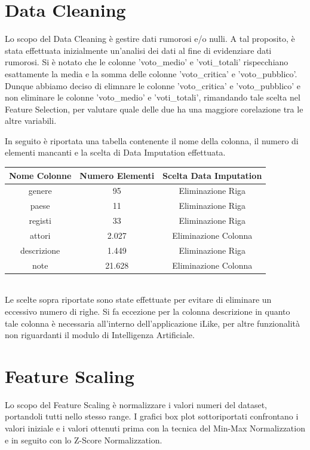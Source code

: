 \documentclass[a4paper, 10pt]{report}
\begin{document}
    \section{Data Cleaning}\label{sec:data-cleaning}
    Lo scopo del Data Cleaning è gestire dati rumorosi e/o nulli.
    A tal proposito, è stata effettuata inizialmente un'analisi dei dati al fine di evidenziare dati rumorosi.
    Si è notato che le colonne 'voto\_medio' e 'voti\_totali' rispecchiano esattamente la media e la somma delle colonne
    'voto\_critica' e 'voto\_pubblico'. Dunque abbiamo deciso di elimnare le colonne 'voto\_critica' e 'voto\_pubblico' e
    non eliminare le colonne 'voto\_medio' e 'voti\_totali', rimandando tale scelta nel Feature Selection, per valutare
    quale delle due ha una maggiore corelazione tra le altre variabili.

    In seguito è riportata una tabella contenente il nome della colonna, il numero di elementi mancanti e la scelta di
    Data Imputation effettuata.\\


    \begin{tabular}{ |c|c|c| }
        \hline \rowcolor{Goldenrod} Nome Colonne & Numero Elementi & Scelta Data Imputation \\
        \hline genere & 95 & Eliminazione Riga \\
        \hline paese & 11 & Eliminazione Riga \\
        \hline registi & 33 & Eliminazione Riga \\
        \hline attori & 2.027 & Eliminazione Colonna \\
        \hline descrizione & 1.449 & Eliminazione Riga \\
        \hline note & 21.628 & Eliminazione Colonna \\
        \hline
    \end{tabular}
    \\

    Le scelte sopra riportate sono state effettuate per evitare di eliminare un eccessivo numero di righe.
    Si fa eccezione per la colonna descrizione in quanto tale colonna è necessaria all'interno dell'applicazione
    iLike, per altre funzionalità non riguardanti il modulo di Intelligenza Artificiale.

    \section{Feature Scaling}\label{sec:feature-scaling}
    Lo scopo del Feature Scaling è normalizzare i valori numeri del dataset, portandoli tutti nello stesso range.
    I grafici box plot sottoriportati confrontano i valori iniziale e i valori ottenuti prima con la tecnica del
    Min-Max Normalizzation e in seguito con lo Z-Score Normalizzation.
\end{document}
